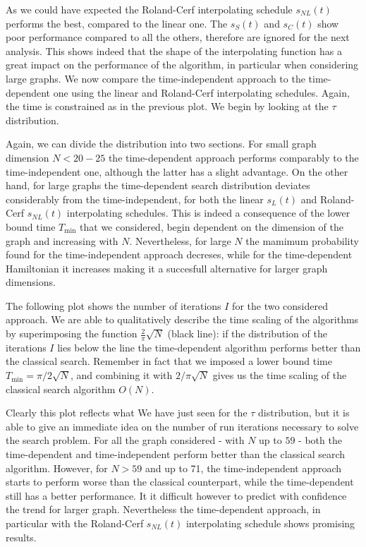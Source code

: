         As we could have expected the Roland-Cerf interpolating schedule $s_{NL}(t)$ performs the best, compared to the linear one. The $s_S(t)$ and $s_C(t)$ show poor performance compared to all the others, therefore are ignored for the next analysis.  This shows indeed that the shape of the interpolating function has a great impact on the performance of the algorithm, in particular when considering large graphs. We now compare the time-independent approach to the time-dependent one using the linear and Roland-Cerf interpolating schedules. Again, the time is constrained as in the previous plot. We begin by looking at the $\tau$ distribution. \\
        \clearpage
        
        Again, we can divide the distribution into two sections. For small graph dimension $N<20-25$ the time-dependent approach performs comparably to the time-independent one, although the latter has a slight advantage. On the other hand, for large graphs the time-dependent search distribution deviates considerably from the time-independent, for both the linear $s_L(t)$ and Roland-Cerf $s_{NL}(t)$ interpolating schedules. This is indeed a consequence of the lower bound time $T_{\min}$ that we considered, begin dependent on the dimension of the graph and increasing with $N$. Nevertheless, for large $N$ the mamimum probability found for the time-independent approach decreses, while for the time-dependent Hamiltonian it increases making it a succesfull alternative for larger graph dimensions.


        \noindent
        The following plot shows the number of iterations $I$ for the two considered approach. We are able to qualitatively describe the time scaling of the algorithms by superimposing the function $\frac{2}{\pi}\sqrt{N}$ (black line): if the distribution of the iterations $I$ lies below the line the time-dependent algorithm performs better than the classical search. Remember in fact that we imposed a lower bound time $T_{\min} = \pi /2 \sqrt{N}$, and combining it with $2/ \pi \sqrt{N}$ gives us the time scaling of the classical search algorithm $O(N)$.

        
        Clearly this plot reflects what We have just seen for the $\tau$ distribution, but it is able to give an immediate idea on the number of run iterations necessary to solve the search problem. For all the graph considered - with $N$ up to $59$ - both the time-dependent and time-independent perform better than the classical search algorithm. However, for $N>59$ and up to 71, the time-independent approach starts to perform worse than the classical counterpart, while the time-dependent still has a better performance. It it difficult however to predict with confidence the trend for larger graph. Nevertheless the time-dependent approach, in particular with the Roland-Cerf $s_{NL}(t)$ interpolating schedule shows promising results.

